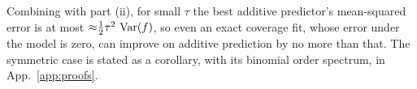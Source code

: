 Combining \thmone{} with part (ii), for small $\tau$ the
best additive predictor's mean-squared error is at most ${\approx}\tfrac12\tau^2\,\operatorname{Var}(f)$, so even
an exact coverage fit, whose error under the model is zero, can improve on additive prediction by no
more than that. 
The symmetric case is stated as a corollary, with its binomial order
spectrum, in App.~\ref{app:proofs}.


